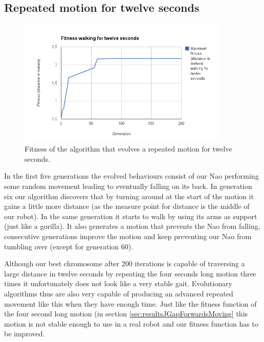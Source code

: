 \documentclass[a4paper,10pt]{article}
\begin{document}
\subsection{Repeated motion for twelve seconds}
\label{sec:resultsJGapForwardsMovingTwelveSeconds}
\begin{figure}[h!]
\includegraphics[width=100mm]{images/walkingtwelve}
\caption{Fitness of the algorithm that evolves a repeated motion for twelve seconds.}
\label{fig:walkingLongFitness}
\end{figure}

In the first five generations the evolved behaviours consist of our Nao performing some random movement leading to eventually falling on its back. In generation six our algorithm discovers that by turning around at the start of the motion it gains a little more distance (as the measure point for distance is the middle of our robot). In the same generation it starts to walk by using its arms as support (just like a gorilla). It also generates a motion that prevents the Nao from falling, consecutive generations improve the motion and keep preventing our Nao from tumbling over (except for generation 60).

Although our best chromosome after 200 iterations is capable of traversing a large distance in twelve seconds by repeating the four seconds long motion three times it unfortunately does not look like a very stable gait. Evolutionary algorithms thus are also very capable of producing an advanced repeated movement like this when they have enough time. Just like the fitness function of the four second long motion (in section \ref{sec:resultsJGapForwardsMoving} this motion is not stable enough to use in a real robot and our fitness function has to be improved. 
\end{document}
